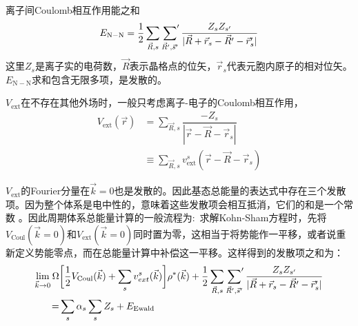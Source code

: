 {离子间\textrm{Coulomb}相互作用能之和
\begin{equation}
	E_{\mathrm{N-N}}=\dfrac12\sum_{\vec R,s}\sideset{}{^{\prime}}\sum_{\vec R^{\prime},\vec s^{\prime}}\dfrac{Z_sZ_{s^{\prime}}}{|\vec R+\vec r_s-\vec R^{\prime}-\vec r_s^{\prime}|}
\end{equation}
这里$Z_s$是离子实的电荷数，$\vec R$表示晶格点的位矢，$\vec r_s$代表元胞内原子的相对位矢。$E_{\mathrm{N-N}}$求和包含无限多项，是发散的。
	
$V_{\mathrm{ext}}$在不存在其他外场时，一般只考虑离子-电子的\textrm{Coulomb}相互作用，
	\begin{equation}
		\begin{aligned}
			V_{\mathrm{ext}}(\vec r)&=\sum_{\vec R,s}\dfrac{-Z_s}{|\vec r-\vec R-\vec r_s|}\\
			&\equiv\sum_{\vec R,s}v_{\mathrm{ext}}^s(\vec r-\vec R-\vec r_s)
		\end{aligned}
	\end{equation}

	$V_{\mathrm{ext}}$的\textrm{Fourier}分量在$\vec k=0$也是发散的。因此基态总能量的表达式中存在三个发散项。因为整个体系是电中性的，意味着这些发散项会相互抵消，它们的和是一个常数%
	。因此周期体系总能量计算的一般流程为:~求解\textrm{Kohn-Sham}方程时，先将$V_{\mathrm{Coul}}(\vec k=0)$和$V_{\mathrm{ext}}(\vec k=0)$同时置为零，这相当于将势能作一平移，或者说重新定义势能零点，而在总能量计算中补偿这一平移。这样得到的发散项之和为：
	\begin{equation}
		\begin{aligned}
			\lim_{\vec k\rightarrow0}\Omega&\bigg[\dfrac12V_{\mathrm{Coul}}(\vec k)+\sum_sv_{ext}^s(\vec k)\bigg]\rho^{\ast}(\vec k)+\dfrac12\sum_{\vec R,s}\sideset{}{^{\prime}}\sum_{\vec R^{\prime},\vec s^{\prime}}\dfrac{Z_sZ_{s^{\prime}}}{|\vec R+\vec r_s-\vec R^{\prime}-\vec r_s^{\prime}|}\\
			=&\sum_s\alpha_s\sum_sZ_s+E_{\mathrm{Ewald}}
		\end{aligned}
	\end{equation}

}
